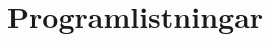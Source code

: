 \documentclass[a4paper,11pt]{article}
\begin{document}
\pagebreak

	\section{Programlistningar}
	\label{sec:programlistningar}	
		
		
		
		
		
		
\end{document}

